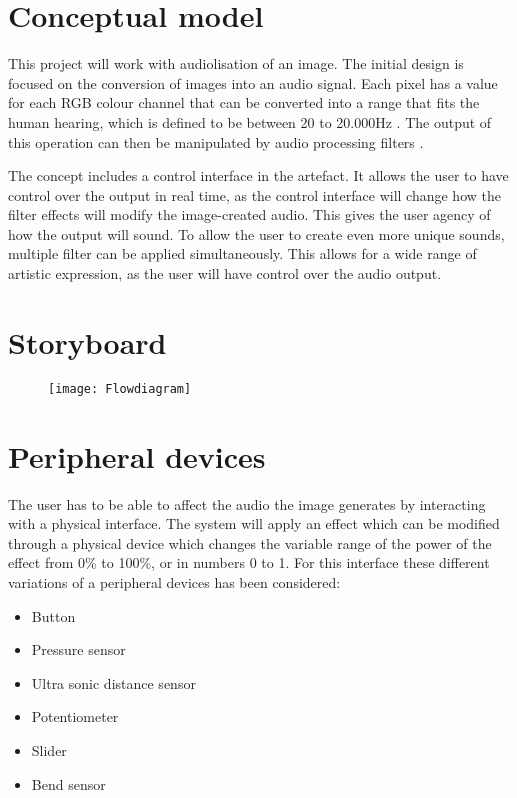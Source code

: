 \section{Conceptual model}\label{sec:concept}
This project will work with audiolisation of an image. The initial design is focused on the conversion of images into an audio signal. Each pixel has a value for each RGB colour channel that can be converted into a range that fits the human hearing, which is defined to be between 20 to 20.000Hz . The output of this operation can then be manipulated by audio processing filters .

The concept includes a control interface in the artefact. It allows the user to have control over the output in real time, as the control interface will change how the filter effects will modify the image-created audio. This gives the user agency of how the output will sound. To allow the user to create even more unique sounds, multiple filter can be applied simultaneously. This allows for a wide range of artistic expression, as the user will have control over the audio output.

\section{Storyboard}
\begin{figure}[!h] 
\centering
\texttt{[image: Flowdiagram]}
\caption{\label{fig:Flowdiagram} }
\end{figure}

\section{Peripheral devices}
The user has to be able to affect the audio the image generates by interacting with a physical interface. The system will apply an effect which can be modified through a physical device which changes the variable range of the power of the effect from 0\% to 100\%, or in numbers 0 to 1. For this interface these different variations of a peripheral devices has been considered: 

\begin{itemize}
\item Button
\item Pressure sensor
\item Ultra sonic distance sensor
\item Potentiometer
\item Slider
\item Bend sensor
\end{itemize}

